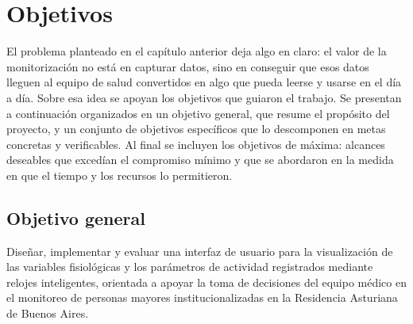 \documentclass[12pt,a4paper]{article}
\begin{document}
\section{Objetivos}

    El problema planteado en el capítulo anterior deja algo en claro: el valor de la monitorización no está en capturar datos, sino en conseguir que esos datos lleguen al equipo de salud convertidos en algo que pueda leerse y usarse en el día a día. Sobre esa idea se apoyan los objetivos que guiaron el trabajo. Se presentan a continuación organizados en un objetivo general, que resume el propósito del proyecto, y un conjunto de objetivos específicos que lo descomponen en metas concretas y verificables. Al final se incluyen los objetivos de máxima: alcances deseables que excedían el compromiso mínimo y que se abordaron en la medida en que el tiempo y los recursos lo permitieron.

    \subsection{Objetivo general}
    Diseñar, implementar y evaluar una interfaz de usuario para la visualización de las variables fisiológicas y los parámetros de actividad registrados mediante relojes inteligentes, orientada a apoyar la toma de decisiones del equipo médico en el monitoreo de personas mayores institucionalizadas en la Residencia Asturiana de Buenos Aires.
\end{document}
